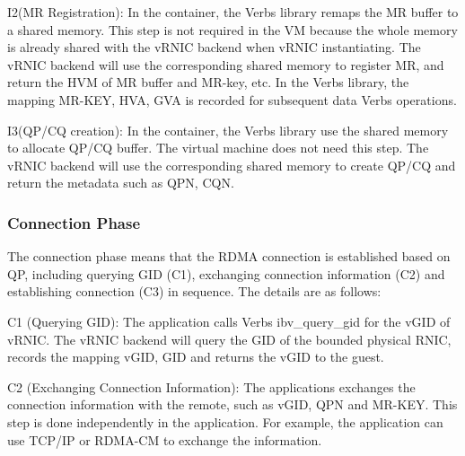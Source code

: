 I2(MR Registration): In the container, the Verbs library remaps the MR buffer to a shared memory. This step is not required in the VM because the whole memory is already shared with the vRNIC backend when vRNIC instantiating. The vRNIC backend will use the corresponding shared memory to register MR, and return the HVM of MR buffer and MR-key, etc. In the Verbs library, the mapping {MR-KEY, HVA, GVA} is recorded for subsequent data Verbs operations.

I3(QP/CQ creation): In the container, the Verbs library use the shared memory to allocate QP/CQ buffer. The virtual machine does not need this step. The vRNIC backend will use the corresponding shared memory to create QP/CQ and return the metadata such as QPN, CQN.

\subsubsection{Connection Phase}
The connection phase means that the RDMA connection is established based on QP, including querying GID (C1), exchanging connection information (C2) and establishing connection (C3) in sequence. The details are as follows:

C1 (Querying GID): The application calls Verbs ibv\_query\_gid for the vGID of vRNIC. The vRNIC backend will query the GID of the bounded physical RNIC, records the mapping {vGID, GID} and returns the vGID to the guest.

C2 (Exchanging Connection Information): The applications exchanges the connection information with the remote, such as vGID, QPN and MR-KEY. This step is done independently in the application. For example, the application can use TCP/IP or RDMA-CM to exchange the information.


